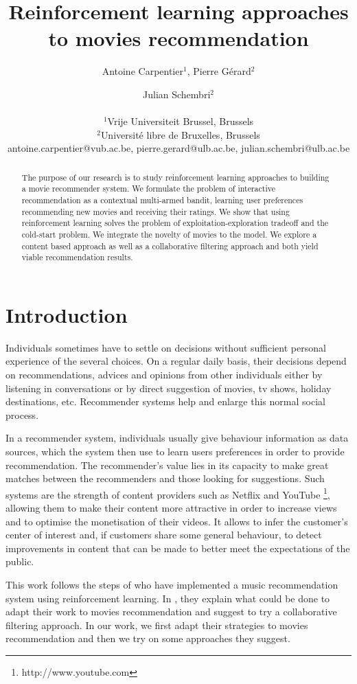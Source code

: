 \documentclass[letterpaper]{article}
\title{Reinforcement learning approaches to movies recommendation}
\author{Antoine Carpentier$^{1}$, Pierre Gérard$^{2}$ \and Julian Schembri$^2$ \\
\mbox{}\\
$^1$Vrije Universiteit Brussel, Brussels \\
$^2$Université libre de Bruxelles, Brussels \\
antoine.carpentier@vub.ac.be, pierre.gerard@ulb.ac.be, julian.schembri@ulb.ac.be}
\begin{document}
\maketitle

\begin{abstract}
  The purpose of our research is to study reinforcement learning approaches to building a movie recommender system. We formulate the problem of interactive recommendation as a contextual multi-armed bandit, learning user preferences recommending new movies and receiving their ratings. We show that using reinforcement learning solves the problem of exploitation-exploration tradeoff and the cold-start problem. We integrate the novelty of movies to the model. We explore a content based approach as well as a collaborative filtering approach and both yield viable recommendation results.
\end{abstract}

\section{Introduction}


Individuals sometimes have to settle on decisions without sufficient personal experience of the several choices. On a regular daily basis, their decisions depend on recommendations, advices and opinions from other individuals either by listening in conversations or by direct suggestion of movies, tv shows, holiday destinations, etc. Recommender systems help and enlarge this normal social process.

In a recommender system, individuals usually give behaviour information as data sources, which the system then use to learn users preferences in order to provide recommendation. The recommender's value lies in its capacity to make great matches between the recommenders and those looking for suggestions. Such systems are the strength of content providers such as Netflix \cite{netflix-article-recommender} and YouTube \footnote{http://www.youtube.com}, allowing them to make their content more attractive in order to increase views and to optimise the monetisation of their videos. It allows to infer the customer's center of interest and, if customers share some general behaviour, to detect improvements in content that can be made to better meet the expectations of the public. 


This work follows the steps of \cite{main} who have implemented a music recommendation system using reinforcement learning. In \cite{main}, they explain what could be done to adapt their work to movies recommendation and suggest to try a collaborative filtering approach. In our work, we first adapt their strategies to movies recommendation and then we try on some approaches they suggest.
\end{document}
